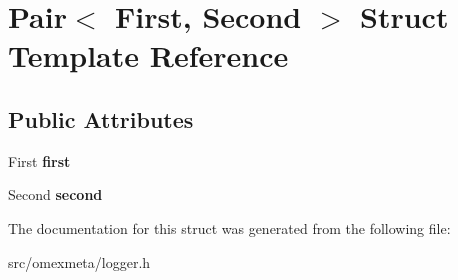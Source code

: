 \hypertarget{structPair}{}\section{Pair$<$ First, Second $>$ Struct Template Reference}
\label{structPair}
\subsection*{Public Attributes}
\begin{DoxyCompactItemize}
\item 
\mbox{\label{structPair_acccddd6bdff96957a1e0714e539ef256}} 
First {\bfseries first}
\item 
\mbox{\label{structPair_a86b9ae89026109ed31635f6c938b5b57}} 
Second {\bfseries second}
\end{DoxyCompactItemize}


The documentation for this struct was generated from the following file\+:\begin{DoxyCompactItemize}
\item 
src/omexmeta/logger.\+h\end{DoxyCompactItemize}
